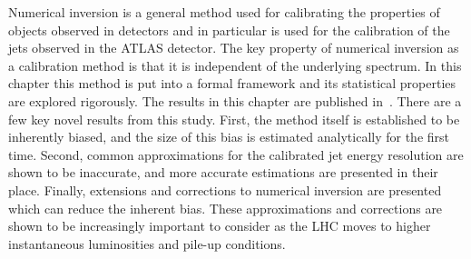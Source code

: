 Numerical inversion is a general method used for calibrating the properties of objects observed in detectors and in particular is used for the calibration of the jets observed in the ATLAS detector.
The key property of numerical inversion as a calibration method is that it is independent of the underlying spectrum.
In this chapter this method is put into a formal framework and its statistical properties are explored rigorously.
The results in this chapter are published in~\cite{Cukierman:2016dkb}.
There are a few key novel results from this study.
First, the method itself is established to be inherently biased, and the size of this bias is estimated analytically for the first time.
Second, common approximations for the calibrated jet energy resolution are shown to be inaccurate, and more accurate estimations are presented in their place. 
Finally, extensions and corrections to numerical inversion are presented which can reduce the inherent bias.
These approximations and corrections are shown to be increasingly important to consider as the LHC moves to higher instantaneous luminosities and pile-up conditions.


